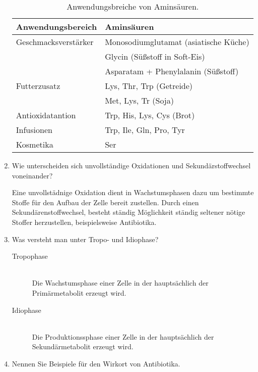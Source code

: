 \begin{enumerate}
		\begin{table}[h!]
		\begin{center}
		\begin{tabular}{l l} 
		\toprule
			Anwendungsbereich	&	Aminsäuren \\
			\midrule
			Geschmacksverstärker	&	Monosodiumglutamat \hfill (asiatische Küche)\\
			\multirow{2}{*}{}		&	Glycin \hfill (Süßstoff in Soft-Eis)\\
										&	Asparatam + Phenylalanin \hfill (Süßstoff)\\
			Futterzusatz			&	Lys, Thr, Trp \hfill	(Getreide) \\
										&	Met, Lys, Tr \hfill(Soja) \\
			Antioxidatantion		&	Trp, His, Lys, Cys \hfill (Brot) \\
			Infusionen				&	Trp, Ile, Gln, Pro, Tyr \\
			Kosmetika				& 	Ser \\
		\bottomrule
		\end{tabular}
		\caption{Anwendungsbreiche von Aminsäuren.}
		\label{tab:anwenungAS}
		\end{center}
		\end{table}

	\item Wie unterscheiden sich unvollständige Oxidationen und Sekundärstoffwechsel voneinander?
		
		Eine unvollstädnige Oxidation dient in Wachstumsphasen dazu um bestimmte Stoffe für den
		Aufbau der Zelle bereit zustellen.
		Durch einen Sekundärenstoffwechsel,
		besteht ständig Möglichkeit ständig seltener nötige Stoffer herzustellen,
		beispielsweise Antibiotika.

	\item Was versteht man unter Tropo- und Idiophase?
		
		\begin{description}
			\item[Tropophase] \hfill \\
				Die Wachstumsphase einer Zelle in der hauptsächlich der Primärmetabolit erzeugt wird.
			\item[Idiophase] \hfill \\
				Die Produktionssphase einer Zelle in der hauptsächlich der Sekundärmetabolit erzeugt wird.
		\end{description}

	\item Nennen Sie Beispiele für den Wirkort von Antibiotika.


\end{enumerate}
